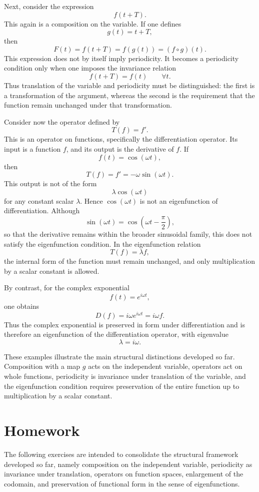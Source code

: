 \documentclass{article}
\begin{document}
	Next, consider the expression
	\[
	f(t+T).
	\]
	This again is a composition on the variable. If one defines
	\[
	g(t)=t+T,
	\]
	then
	\[
	F(t)=f(t+T)=f(g(t))=(f\circ g)(t).
	\]
	This expression does not by itself imply periodicity. It becomes a periodicity condition only when one imposes the invariance relation
	\[
	f(t+T)=f(t)\qquad \forall t.
	\]
	Thus translation of the variable and periodicity must be distinguished: the first is a transformation of the argument, whereas the second is the requirement that the function remain unchanged under that transformation.
	
	Consider now the operator defined by
	\[
	T(f)=f'.
	\]
	This is an operator on functions, specifically the differentiation operator. Its input is a function \(f\), and its output is the derivative of \(f\). If
	\[
	f(t)=\cos(\omega t),
	\]
	then
	\[
	T(f)=f'=-\omega\sin(\omega t).
	\]
	This output is not of the form
	\[
	\lambda \cos(\omega t)
	\]
	for any constant scalar \(\lambda\). Hence \(\cos(\omega t)\) is not an eigenfunction of differentiation. Although
	\[
	\sin(\omega t)=\cos\!\left(\omega t-\frac{\pi}{2}\right),
	\]
	so that the derivative remains within the broader sinusoidal family, this does not satisfy the eigenfunction condition. In the eigenfunction relation
	\[
	T(f)=\lambda f,
	\]
	the internal form of the function must remain unchanged, and only multiplication by a scalar constant is allowed.
	
	By contrast, for the complex exponential
	\[
	f(t)=e^{i\omega t},
	\]
	one obtains
	\[
	D(f)=i\omega e^{i\omega t}=i\omega f.
	\]
	Thus the complex exponential is preserved in form under differentiation and is therefore an eigenfunction of the differentiation operator, with eigenvalue
	\[
	\lambda=i\omega.
	\]
	
	These examples illustrate the main structural distinctions developed so far. Composition with a map \(g\) acts on the independent variable, operators act on whole functions, periodicity is invariance under translation of the variable, and the eigenfunction condition requires preservation of the entire function up to multiplication by a scalar constant.
	
	\section*{Homework}
	
	The following exercises are intended to consolidate the structural framework developed so far, namely composition on the independent variable, periodicity as invariance under translation, operators on function spaces, enlargement of the codomain, and preservation of functional form in the sense of eigenfunctions.
	
\end{document}
